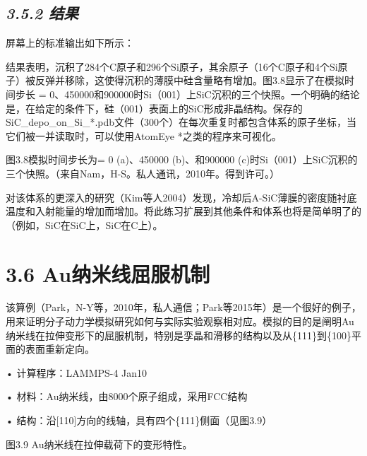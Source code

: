 
\hypertarget{ux7ed3ux679c-4}{%
\subsection{\texorpdfstring{\emph{3.5.2
结果}}{3.5.2 结果}}\label{ux7ed3ux679c-4}}

屏幕上的标准输出如下所示：


结果表明，沉积了284个C原子和296个Si原子，其余原子（16个C原子和4个Si原子）被反弹并移除，这使得沉积的薄膜中硅含量略有增加。图3.8显示了在模拟时间步长
=
0、450000和900000时Si（001）上SiC沉积的三个快照。一个明确的结论是，在给定的条件下，硅（001）表面上的SiC形成非晶结构。保存的SiC\_depo\_on\_Si\_*.pdb文件（300个）在每次重复时都包含体系的原子坐标，当它们被一并读取时，可以使用AtomEye
*之类的程序来可视化。


图3.8模拟时间步长为= 0 (a)、450000 (b)、和900000
(c)时Si（001）上SiC沉积的三个快照。（来自Nam，H-S。私人通讯，2010年。得到许可。）

对该体系的更深入的研究（Kim等人2004）发现，冷却后A-SiC薄膜的密度随衬底温度和入射能量的增加而增加。将此练习扩展到其他条件和体系也将是简单明了的（例如，SiC在SiC上，SiC在C上）。

\hypertarget{auux7eb3ux7c73ux7ebfux5c48ux670dux673aux5236}{%
\section{3.6
Au纳米线屈服机制}\label{auux7eb3ux7c73ux7ebfux5c48ux670dux673aux5236}}

该算例（Park，N-Y等，2010年，私人通信；Park等2015年）是一个很好的例子，用来证明分子动力学模拟研究如何与实际实验观察相对应。模拟的目的是阐明Au纳米线在拉伸变形下的屈服机制，特别是孪晶和滑移的结构以及从\{111\}到\{100\}平面的表面重新定向。

• 计算程序：LAMMPS-4 Jan10

• 材料：Au纳米线，由8000个原子组成，采用FCC结构

• 结构：沿{[}110{]}方向的线轴，具有四个\{111\}侧面（见图3.9）


图3.9 Au纳米线在拉伸载荷下的变形特性。

